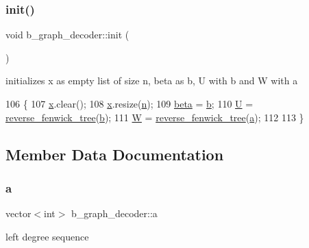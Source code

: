 \subsubsection{\texorpdfstring{init()}{init()}}
{\footnotesize\ttfamily void b\+\_\+graph\+\_\+decoder\+::init (\begin{DoxyParamCaption}{ }\end{DoxyParamCaption})}



initializes x as empty list of size n, beta as b, U with b and W with a 


\begin{DoxyCode}
106 \{
107   \hyperlink{classb__graph__decoder_a6bba2e67984f9733fc60c40dd4956587}{x}.clear();
108   \hyperlink{classb__graph__decoder_a6bba2e67984f9733fc60c40dd4956587}{x}.resize(\hyperlink{classb__graph__decoder_a2caddd63df6808c95e2ee738f7c77870}{n});
109   \hyperlink{classb__graph__decoder_a3e5babfb07af486c1d9e991f65251266}{beta} = \hyperlink{classb__graph__decoder_a12d1a4a91f342111d2116196cb826317}{b};
110   \hyperlink{classb__graph__decoder_ae15e74088bb60a096562a9bdaf380f2c}{U} = \hyperlink{classreverse__fenwick__tree}{reverse\_fenwick\_tree}(\hyperlink{classb__graph__decoder_a12d1a4a91f342111d2116196cb826317}{b});
111   \hyperlink{classb__graph__decoder_a2c3f91db1f54ddfd411f74d18b01b606}{W} = \hyperlink{classreverse__fenwick__tree}{reverse\_fenwick\_tree}(\hyperlink{classb__graph__decoder_afcf783e4199fb8f9d6828db08bb12333}{a});
112   
113 \}
\end{DoxyCode}


\subsection{Member Data Documentation}
\mbox{\label{classb__graph__decoder_afcf783e4199fb8f9d6828db08bb12333}} 
\subsubsection{\texorpdfstring{a}{a}}
{\footnotesize\ttfamily vector$<$int$>$ b\+\_\+graph\+\_\+decoder\+::a\hspace{0.3cm}{\ttfamily [private]}}



left degree sequence 

\mbox{\label{classb__graph__decoder_a12d1a4a91f342111d2116196cb826317}} 
